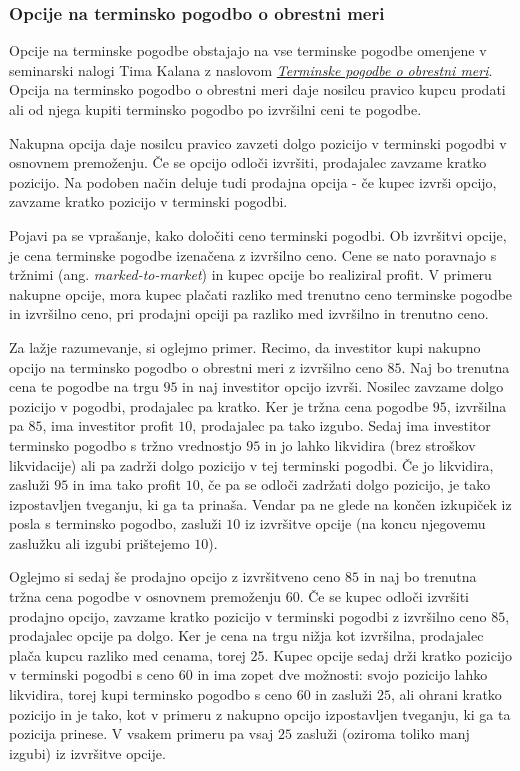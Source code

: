\documentclass[a4paper]{article}
\begin{document}
\subsubsection{Opcije na terminsko pogodbo o obrestni meri}
Opcije na terminske pogodbe obstajajo na vse terminske pogodbe omenjene v seminarski nalogi Tima Kalana z naslovom 
\href{https://github.com/timkalan/seminar2020}{\textit{Terminske pogodbe o obrestni meri}}. Opcija na terminsko pogodbo o obrestni meri  daje nosilcu pravico
kupcu prodati ali od njega kupiti terminsko pogodbo po izvršilni ceni te pogodbe.

Nakupna opcija daje nosilcu pravico zavzeti dolgo pozicijo v terminski pogodbi v osnovnem premoženju. Če se opcijo odloči izvršiti,
prodajalec zavzame kratko pozicijo. Na podoben način deluje tudi prodajna opcija - če kupec izvrši opcijo, zavzame kratko pozicijo v terminski
pogodbi. 

Pojavi pa se vprašanje, kako določiti ceno terminski pogodbi. Ob izvršitvi opcije, je cena terminske pogodbe izenačena z izvršilno ceno.
Cene se nato poravnajo s tržnimi (ang. \textit{marked-to-market}) in kupec opcije bo realiziral profit. V primeru nakupne opcije, mora kupec plačati razliko med trenutno
ceno terminske pogodbe in izvršilno ceno, pri prodajni opciji pa razliko med izvršilno in trenutno ceno.

Za lažje razumevanje, si oglejmo primer. Recimo, da investitor kupi nakupno opcijo na terminsko pogodbo o obrestni meri z izvršilno ceno
\textdollar$85$. Naj bo trenutna cena te pogodbe na trgu \textdollar$95$  in naj investitor opcijo izvrši. Nosilec zavzame dolgo pozicijo v pogodbi, prodajalec
pa kratko. Ker je tržna cena pogodbe \textdollar$95$, izvršilna pa \textdollar$85$, ima investitor profit \textdollar$10$, prodajalec pa tako izgubo. Sedaj ima
investitor terminsko pogodbo s tržno vrednostjo \textdollar$95$ in jo lahko likvidira (brez stroškov likvidacije) ali pa zadrži dolgo pozicijo v
tej terminski pogodbi. Če jo likvidira, zasluži \textdollar$95$ in ima tako profit \textdollar$10$, če pa se odloči zadržati dolgo pozicijo, je tako izpostavljen
tveganju, ki ga ta prinaša. Vendar pa ne glede na končen izkupiček iz posla s terminsko pogodbo, zasluži \textdollar$10$ iz izvršitve opcije
(na koncu njegovemu zaslužku ali izgubi prištejemo \textdollar$10$).

Oglejmo si sedaj še prodajno opcijo z izvršitveno ceno \textdollar$85$ in naj bo trenutna tržna cena pogodbe v osnovnem premoženju \textdollar$60$. Če se kupec odloči
izvršiti prodajno opcijo, zavzame kratko pozicijo v terminski pogodbi z izvršilno ceno \textdollar$85$, prodajalec opcije pa dolgo. Ker je cena
na trgu nižja kot izvršilna, prodajalec plača kupcu razliko med cenama, torej \textdollar$25$. Kupec opcije sedaj drži kratko pozicijo
v terminski pogodbi s ceno 60 in ima zopet dve možnosti: svojo pozicijo lahko likvidira, torej kupi terminsko pogodbo s ceno \textdollar$60$ in zasluži \textdollar$25$, 
ali ohrani kratko pozicijo in je tako, kot v primeru z nakupno opcijo izpostavljen tveganju, ki ga ta pozicija prinese. V vsakem primeru pa vsaj \textdollar$25$ zasluži
(oziroma toliko manj izgubi) iz izvršitve opcije.
\end{document}
